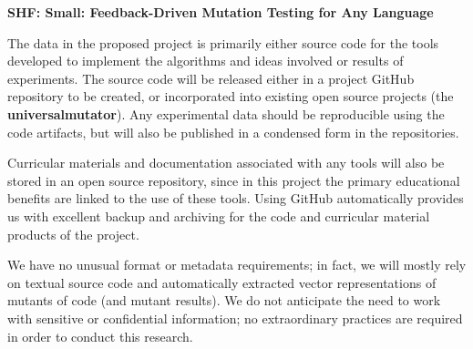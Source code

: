 \documentclass{article}
\begin{document}
\begin{center}
{\Large\sf\textbf{SHF: Small: Feedback-Driven Mutation Testing for Any Language}}
\end{center}

The data in the proposed project is primarily either source code for
the tools developed to implement the algorithms and ideas involved or
results of experiments.  The source code will be released either in a
project GitHub repository to be created, or incorporated into existing
open source projects (the {\bf universalmutator}).  Any experimental data should be reproducible using the code artifacts, but will also be published in a condensed form in the repositories.

Curricular
materials and documentation associated with any tools will also be stored in
an open source repository, since in this project the primary
educational benefits are linked to the use of these tools.  Using GitHub automatically provides us with excellent backup
and archiving for the code and curricular material products of the
project.

We have no unusual format or metadata requirements; in fact, we will
mostly rely on textual source code and automatically extracted vector
representations of mutants of code (and mutant results).
We do not anticipate the need to work with sensitive or confidential
information; no extraordinary practices are required in order to
conduct this research.
\end{document}
